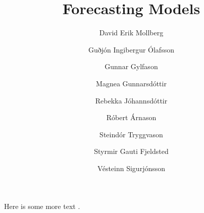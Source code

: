 \documentclass[10pt]{article}
\title{Forecasting Models}
\author{David Erik Mollberg \and Guðjón Ingibergur Ólafsson \and Gunnar Gylfason \and Magnea Gunnarsdóttir \and Rebekka Jóhannsdóttir \and Róbert Árnason \and Steindór Tryggvason \and Styrmir Gauti Fjeldsted \and Vésteinn Sigurjónsson}
\begin{document}
\maketitle

Here is some more text \cite{mcconnell2009analysis}.












\end{document}
